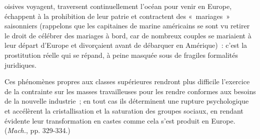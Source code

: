 \documentclass[french,twoside]{book} %
\begin{document}
oisives voyagent, traversent continuellement l’océan pour venir en Europe, échappent à la prohibition de leur patrie et contractent des « mariages » saisonniers (rappelons que les capitaines de marine américains se sont vu retirer le droit de célébrer des mariages à bord, car de nombreux couples se mariaient à leur départ d’Europe et divorçaient avant de débarquer en Amérique) : c’est la prostitution réelle qui se répand, à peine masquée sous de fragiles formalités juridiques.\par
Ces phénomènes propres aux classes supérieures rendront plus difficile l’exercice de la contrainte sur les masses travailleuses pour les rendre conformes aux besoins de la nouvelle industrie ; en tout cas ils déterminent une rupture psychologique et accélèrent la cristallisation et la saturation des groupes sociaux, en rendant évidente leur transformation en castes comme cela s’est produit en Europe. (\emph{Mach.}, pp. 329-334.)
\end{document}
